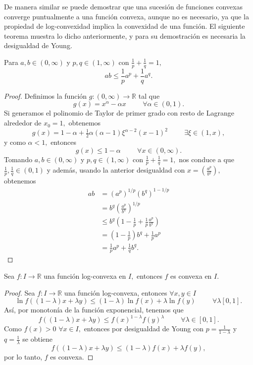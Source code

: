 De manera similar se puede demostrar que una sucesión de funciones convexas converge puntualmente a una función convexa, aunque no es necesario, ya que la propiedad de log-convexidad implica la convexidad de una función. El siguiente teorema muestra lo dicho anteriormente, y para su demostración es necesaria la desigualdad de Young.
\begin{lemma}
	Para $a,b \in (0,\infty)$ y $p, q \in (1,\infty)$ con $\tfrac{1}{p}+\tfrac{1}{q} = 1,$ $$ab \leq \frac{1}{p}a^p+\frac{1}{q}a^q.$$
\end{lemma}
\begin{proof}
	Definimos la función $g: (0,\infty) \rightarrow \mathbb{R}$ tal que $$g(x) = x^\alpha - \alpha x\hspace{1cm} \forall \alpha \in (0,1).$$ Si generamos el polinomio de Taylor de primer grado con resto de Lagrange alrededor de $x_0 = 1,$ obtenemos $$g(x) = 1-\alpha + \tfrac{1}{2}\alpha (\alpha -1)\xi^{\alpha -2}(x-1)^2\hspace{1cm} \exists \xi \in (1,x),$$ y como $\alpha < 1,$ entonces $$g(x) \leq 1-\alpha \hspace{1cm} \forall x \in (0,\infty).$$
	Tomando $a,b \in (0,\infty)$ y $p, q \in (1,\infty)$ con $\tfrac{1}{p}+\tfrac{1}{q} = 1,$ nos conduce a que $\tfrac{1}{p}, \tfrac{1}{q} \in (0,1)$ y además, usando la anterior desigualdad con $x = \left(\tfrac{a^p}{b^q}\right),$ obtenemos
	\begin{align*}
	ab &= (a^p)^{1/p}(b^q)^{1-1/p}\\
	&= b^q\left(\frac{a^p}{b^q}\right)^{1/p}\\
	&\leq b^q\left(1-\frac{1}{p}+\frac{1}{p} \frac{a^p}{b^q}\right)\\
	&= \left(1-\frac{1}{p}\right)b^q+\frac{1}{p}a^p\\
	&= \frac{1}{p}a^p+\frac{1}{q}b^q.
	\end{align*}
\end{proof}
\begin{theorem}
	Sea $f: I \rightarrow \mathbb{R}$ una función log-convexa en $I,$ entonces $f$ es convexa en $I.$
\end{theorem}
\begin{proof}
	Sea $f: I \rightarrow \mathbb{R}$ una función log-convexa, entonces $\forall x, y \in I$ $$\ln f((1-\lambda)x+\lambda y) \leq (1-\lambda)\ln f(x)+\lambda \ln f(y)\hspace{1cm} \forall \lambda [0,1].$$ Así, por monotonía de la función exponencial, tenemos que $$f((1-\lambda)x+\lambda y) \leq f(x)^{1-\lambda}f(y)^{\lambda}\hspace{1cm} \forall \lambda \in [0,1].$$
	Como $f(x) > 0$ $\forall x \in I,$ entonces por desigualdad de Young con $p = \tfrac{1}{1-\lambda}$ y $q = \tfrac{1}{\lambda}$ se obtiene $$f((1-\lambda)x+\lambda y) \leq (1-\lambda)f(x)+\lambda f(y),$$ por lo tanto, $f$ es convexa.
\end{proof}
